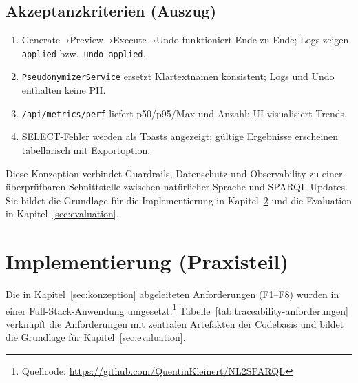 \section{Akzeptanzkriterien (Auszug)}
\begin{enumerate}
  \item Generate→Preview→Execute→Undo funktioniert Ende-zu-Ende; Logs zeigen \texttt{applied} bzw.\ \texttt{undo\_applied}.
  \item \texttt{PseudonymizerService} ersetzt Klartextnamen konsistent; Logs und Undo enthalten keine PII.
  \item \texttt{/api/metrics/perf} liefert p50/p95/Max und Anzahl; UI visualisiert Trends.
  \item SELECT-Fehler werden als Toasts angezeigt; gültige Ergebnisse erscheinen tabellarisch mit Exportoption.
\end{enumerate}

\medskip
Diese Konzeption verbindet Guardrails, Datenschutz und Observability zu einer überprüfbaren Schnittstelle zwischen natürlicher Sprache und SPARQL-Updates. Sie bildet die Grundlage für die Implementierung in Kapitel~\ref{sec:implementierung} und die Evaluation in Kapitel~\ref{sec:evaluation}.







\chapter{Implementierung (Praxisteil)}
\label{sec:implementierung}

Die in Kapitel~\ref{sec:konzeption} abgeleiteten Anforderungen (F1–F8) wurden in einer Full-Stack-Anwendung umgesetzt.\footnote{Quellcode: \url{https://github.com/QuentinKleinert/NL2SPARQL}} Tabelle~\ref{tab:traceability-anforderungen} verknüpft die Anforderungen mit zentralen Artefakten der Codebasis und bildet die Grundlage für Kapitel~\ref{sec:evaluation}.

